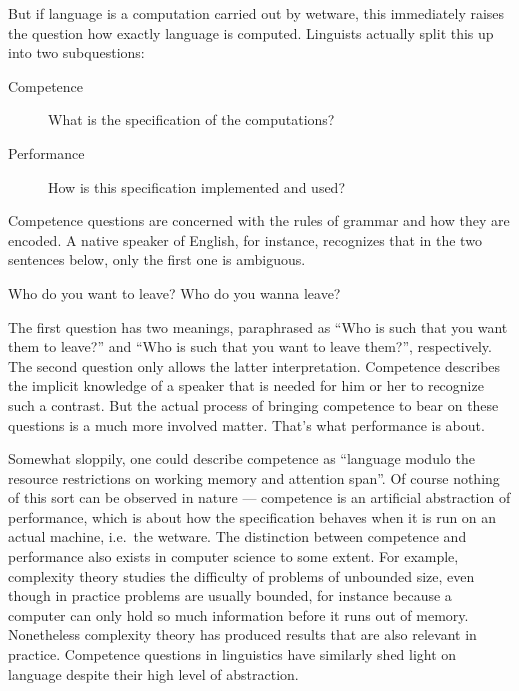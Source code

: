 But if language is a computation carried out by wetware, this immediately raises the question how exactly language is computed.
Linguists actually split this up into two subquestions:
%
\begin{description}
    \item[Competence]
        What is the specification of the computations?
    \item[Performance]
        How is this specification implemented and used?
\end{description}
%
Competence questions are concerned with the rules of grammar and how they are encoded.
A native speaker of English, for instance, recognizes that in the two sentences below, only the first one is ambiguous.
%
\begin{exe}
    \ex
    \begin{xlist}
        \ex Who do you want to leave?
        \ex Who do you wanna leave?
    \end{xlist}
\end{exe}
%
The first question has two meanings, paraphrased as ``Who is such that you want them to leave?'' and ``Who is such that you want to leave them?'', respectively.
The second question only allows the latter interpretation.
Competence describes the implicit knowledge of a speaker that is needed for him or her to recognize such a contrast.
But the actual process of bringing competence to bear on these questions is a much more involved matter.
That's what performance is about.

Somewhat sloppily, one could describe competence as ``language modulo the resource restrictions on working memory and attention span''.
Of course nothing of this sort can be observed in nature --- competence is an artificial abstraction of performance, which is about how the specification behaves when it is run on an actual machine, i.e.\ the wetware.
The distinction between competence and performance also exists in computer science to some extent.
For example, complexity theory studies the difficulty of problems of unbounded size, even though in practice problems are usually bounded, for instance because a computer can only hold so much information before it runs out of memory.
Nonetheless complexity theory has produced results that are also relevant in practice.
Competence questions in linguistics have similarly shed light on language despite their high level of abstraction.

